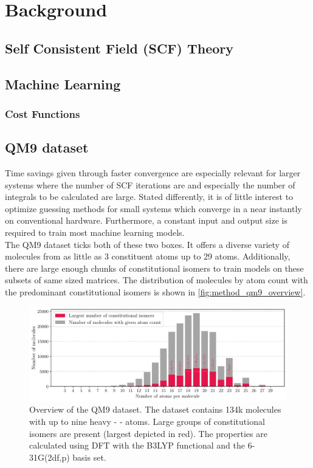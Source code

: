 \chapter{Background}
\label{sec:background}

\section{Self Consistent Field (SCF) Theory}
\label{sec:background_scf}

\section{Machine Learning}
\label{sec:background_ml}

\subsection{Cost Functions}
\label{subsec:background_cost_function}

\section{QM9 dataset \parencite{ref:data_qm9}}
\label{sec:qm9}
Time savings given through faster convergence are especially relevant for larger systems where the number of SCF iterations are and especially the number of integrals to be calculated are large. Stated differently, it is of little interest to optimize guessing methods for small systems which converge in a near instantly on conventional hardware. Furthermore, a constant input and output size is required to train most machine learning models. \\
The QM9 dataset \parencite{ref:article1_qm9,ref:article2_qm9} ticks both of these two boxes. It offers a diverse variety of molecules from as little as 3 constituent atoms up to 29 atoms. Additionally, there are large enough chunks of constitutional isomers to train models on these subsets of same sized matrices. The distribution of molecules by atom count with the predominant constitutional isomers is shown in \autoref{fig:method_qm9_overview}.
\begin{figure}[H]
    \centering
    \includegraphics[width=\textwidth]{../fig/qm9_general/qm9_overview_stacked_bar.pdf}
    \caption[QM9 dataset overview]{Overview of the QM9 dataset. The dataset contains 134k molecules with up to nine heavy -     - atoms. Large groups of constitutional isomers are present (largest depicted in red). The properties are calculated using DFT with the B3LYP functional and the 6-31G(2df,p) basis set.}
    \label{fig:method_qm9_overview}
\end{figure}
